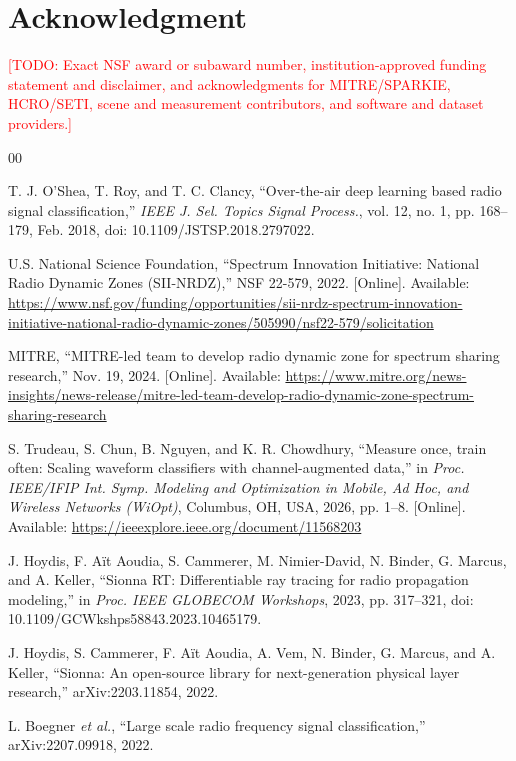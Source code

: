 \documentclass[10pt,conference,letterpaper]{IEEEtran}
\newcommand{\todo}[1]{\textcolor{red}{[TODO: #1]}}
\begin{document}
\section*{Acknowledgment}

\todo{Exact NSF award or subaward number, institution-approved funding statement and disclaimer, and acknowledgments for MITRE/SPARKIE, HCRO/SETI, scene and measurement contributors, and software and dataset providers.}

\begin{thebibliography}{00}

T. J. O'Shea, T. Roy, and T. C. Clancy, ``Over-the-air deep learning based radio signal classification,'' \emph{IEEE J. Sel. Topics Signal Process.}, vol. 12, no. 1, pp. 168--179, Feb. 2018, doi: 10.1109/JSTSP.2018.2797022.

U.S. National Science Foundation, ``Spectrum Innovation Initiative: National Radio Dynamic Zones (SII-NRDZ),'' NSF 22-579, 2022. [Online]. Available: \url{https://www.nsf.gov/funding/opportunities/sii-nrdz-spectrum-innovation-initiative-national-radio-dynamic-zones/505990/nsf22-579/solicitation}

MITRE, ``MITRE-led team to develop radio dynamic zone for spectrum sharing research,'' Nov. 19, 2024. [Online]. Available: \url{https://www.mitre.org/news-insights/news-release/mitre-led-team-develop-radio-dynamic-zone-spectrum-sharing-research}

S. Trudeau, S. Chun, B. Nguyen, and K. R. Chowdhury, ``Measure once, train often: Scaling waveform classifiers with channel-augmented data,'' in \emph{Proc. IEEE/IFIP Int. Symp. Modeling and Optimization in Mobile, Ad Hoc, and Wireless Networks (WiOpt)}, Columbus, OH, USA, 2026, pp. 1--8. [Online]. Available: \url{https://ieeexplore.ieee.org/document/11568203}

J. Hoydis, F. A\"it Aoudia, S. Cammerer, M. Nimier-David, N. Binder, G. Marcus, and A. Keller, ``Sionna RT: Differentiable ray tracing for radio propagation modeling,'' in \emph{Proc. IEEE GLOBECOM Workshops}, 2023, pp. 317--321, doi: 10.1109/GCWkshps58843.2023.10465179.

J. Hoydis, S. Cammerer, F. A\"it Aoudia, A. Vem, N. Binder, G. Marcus, and A. Keller, ``Sionna: An open-source library for next-generation physical layer research,'' arXiv:2203.11854, 2022.

L. Boegner \emph{et al.}, ``Large scale radio frequency signal classification,'' arXiv:2207.09918, 2022.


\end{thebibliography}
\end{document}
